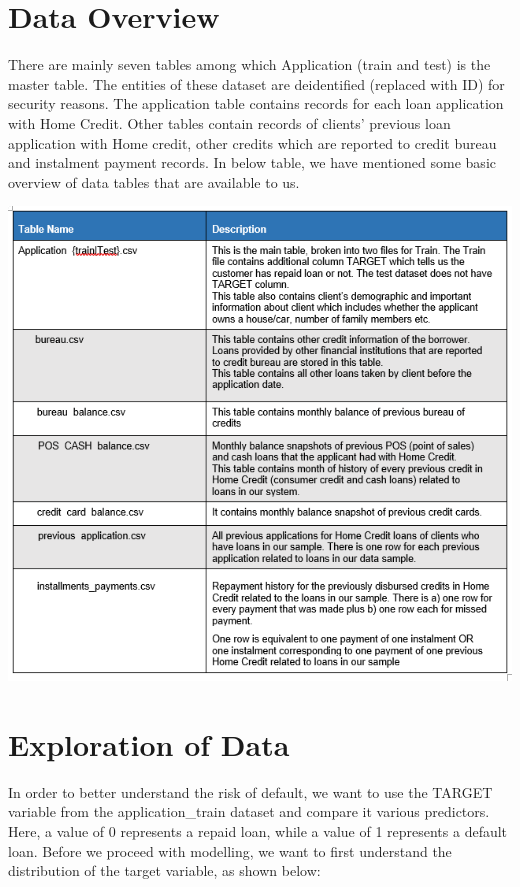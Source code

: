 \documentclass[]{book}
\begin{document}
\hypertarget{data-overview}{%
\chapter{Data Overview}\label{data-overview}}

There are mainly seven tables among which Application (train and test) is the master table. The entities of these dataset are deidentified (replaced with ID) for security reasons. The application table contains records for each loan application with Home Credit. Other tables contain records of clients' previous loan application with Home credit, other credits which are reported to credit bureau and instalment payment records.
In below table, we have mentioned some basic overview of data tables that are available to us.

\includegraphics{Images/table.png}

\hypertarget{exploration-of-data}{%
\chapter{Exploration of Data}\label{exploration-of-data}}

In order to better understand the risk of default, we want to use the TARGET variable from the application\_train dataset and compare it various predictors. Here, a value of 0 represents a repaid loan, while a value of 1 represents a default loan. Before we proceed with modelling, we want to first understand the distribution of the target variable, as shown below:
\end{document}
